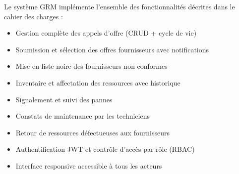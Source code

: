 Le système GRM implémente l'ensemble des fonctionnalités décrites dans le cahier des charges :

\begin{itemize}
    \item \checkmark Gestion complète des appels d'offre (CRUD + cycle de vie)
    \item \checkmark Soumission et sélection des offres fournisseurs avec notifications
    \item \checkmark Mise en liste noire des fournisseurs non conformes
    \item \checkmark Inventaire et affectation des ressources avec historique
    \item \checkmark Signalement et suivi des pannes
    \item \checkmark Constats de maintenance par les techniciens
    \item \checkmark Retour de ressources défectueuses aux fournisseurs
    \item \checkmark Authentification JWT et contrôle d'accès par rôle (RBAC)
    \item \checkmark Interface responsive accessible à tous les acteurs
\end{itemize}
